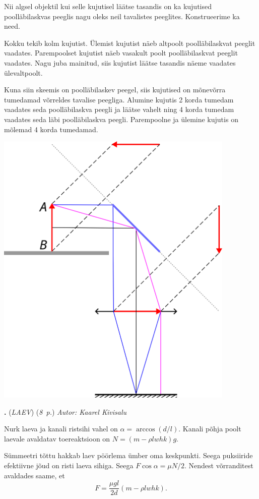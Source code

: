 \documentclass[11pt,a5paper]{article}
\newcommand{\numb}[1]{\vspace{5pt}\textbf{\large #1}}
\newcommand{\nimi}[1]{(\textsl{\small \uppercase{#1}})}
\newcommand{\punktid}[1]{(\emph{#1~p.})}
\newcounter{ylesanne}
\newcommand{\yl}[1]{\addtocounter{ylesanne}{1}\numb{\theylesanne.} \nimi{#1} \newblock{}}
\newcommand{\autor}[1]{\emph{Autor: #1}}%
\begin{document}
Nii algsel objektil kui selle kujutisel läätse tasandis on ka kujutised poolläbilaskvas peeglis nagu oleks neil tavalistes peeglites. Konstrueerime ka need.

Kokku tekib kolm kujutist. Ülemist kujutist näeb altpoolt poolläbilaskvat peeglit vaadates. Parempoolset kujutist näeb vasakult poolt poolläbilaskvat peeglit vaadates. Nagu juba mainitud, siis kujutist läätse tasandis näeme vaadates ülevaltpoolt.

Kuna siin skeemis on poolläbilaskev peegel, siis kujutised on mõnevõrra tumedamad võrreldes tavalise peegliga. Alumine kujutis 2 korda tumedam vaadates seda poolläbilaskva peegli ja läätse vahelt ning 4 korda tumedam vaadates seda läbi poolläbilaskva peegli. Parempoolne ja ülemine kujutis on mõlemad 4 korda tumedamad.
\begin{center}
  \includegraphics[width=0.86\textwidth]{optika-lah.png}
\end{center}

\yl{Laev}
\punktid{8} \autor{Kaarel Kivisalu} \par
Nurk laeva ja kanali ristsihi vahel on $ \alpha = \arccos (d/l)$. Kanali põhja poolt laevale avaldatav toereaktsioon on $N = (m-\rho lwh k) g$.

Sümmeetri tõttu hakkab laev pöörlema ümber oma keskpunkti. Seega puksiiride efektiivne jõud on risti laeva sihiga. Seega $F \cos \alpha = \mu N/2$. Nendest võrranditest avaldades saame, et
\begin{equation*}
F=\frac{\mu g l}{2d} (m-\rho l w h k).
\end{equation*}
\end{document}
